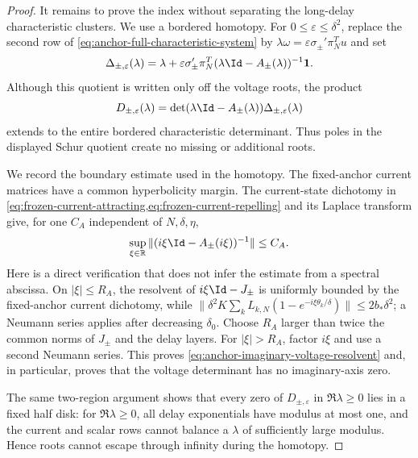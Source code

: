 \begin{proof}
It remains to prove the index without separating the long-delay
characteristic clusters.  We use a bordered homotopy.  For
\(0\le\varepsilon\le\delta^2\), replace the second row of
\cref{eq:anchor-full-characteristic-system} by
\(\lambda\omega=\varepsilon\sigma_\pm'\pi_N^Tu\) and set
\begin{equation}
 \Delta_{\pm,\varepsilon}(\lambda)
 =\lambda+\varepsilon\sigma_\pm'\pi_N^T
   (\lambda\Id-A_\pm(\lambda))^{-1}\mathbf1.       \label{eq:anchor-homotopy-Schur}
\end{equation}
Although this quotient is written only off the voltage roots, the product
\begin{equation}
 D_{\pm,\varepsilon}(\lambda)
 =\det(\lambda\Id-A_\pm(\lambda))
       \Delta_{\pm,\varepsilon}(\lambda)              \label{eq:anchor-bordered-characteristic-function}
\end{equation}
extends to the entire bordered characteristic determinant.  Thus poles in
the displayed Schur quotient create no missing or additional roots.

We record the boundary estimate used in the homotopy.  The fixed-anchor
current matrices have a common hyperbolicity margin.  The current-state
dichotomy in \cref{eq:frozen-current-attracting,eq:frozen-current-repelling}
and its Laplace transform give, for one \(C_A\) independent of
\(N,\delta,\eta\),
\begin{equation}
 \sup_{\xi\in\mathbb R}
 \|(i\xi\Id-A_\pm(i\xi))^{-1}\|\le C_A. \label{eq:anchor-imaginary-voltage-resolvent}
\end{equation}
Here is a direct verification that does not infer the estimate from a
spectral abscissa.  On \(|\xi|\le R_A\), the resolvent of
\(i\xi\Id-J_\pm\) is uniformly bounded by the fixed-anchor current
dichotomy, while
\(\|\delta^2K\sum_kL_{k,N}(1-e^{-i\xi\theta_k/\delta})\|\le
2b_*\delta^2\); a Neumann series applies after decreasing
\(\delta_0\).  Choose \(R_A\) larger than twice the common norms of
\(J_\pm\) and the delay layers.  For \(|\xi|>R_A\), factor
\(i\xi\) and use a second Neumann series.  This proves
\cref{eq:anchor-imaginary-voltage-resolvent} and, in particular, proves
that the voltage determinant has no imaginary-axis zero.

The same two-region argument shows that every zero of
\(D_{\pm,\varepsilon}\) in \(\Re\lambda\ge0\) lies in a
fixed half disk: for \(\Re\lambda\ge0\), all delay exponentials have
modulus at most one, and the current and scalar rows cannot balance a
\(\lambda\) of sufficiently large modulus.  Hence roots cannot escape
through infinity during the homotopy.


\end{proof}

